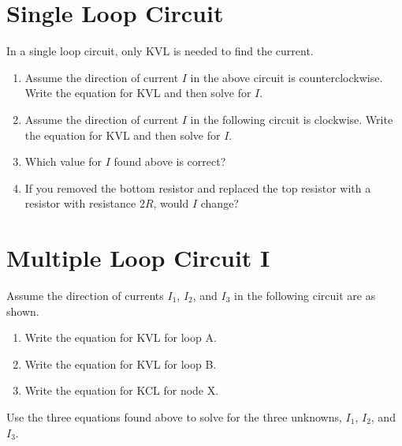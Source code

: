 \documentclass{article}
\begin{document}
\newpage

\section{Single Loop Circuit}

In a single loop circuit, only KVL is needed to find the current.



\begin{enumerate}

  \item Assume the direction of current $I$ in the above circuit is counterclockwise. Write the equation for KVL and then solve for $I$.

  \item Assume the direction of current $I$ in the following circuit is clockwise. Write the equation for KVL and then solve for $I$.

  \item Which value for $I$ found above is correct?

  \item If you removed the bottom resistor and replaced the top resistor with a resistor with resistance $2R$, would $I$ change?

\end{enumerate}

\section{Multiple Loop Circuit I}

Assume the direction of currents $I_1$, $I_2$, and $I_3$ in the following circuit are as shown.



\begin{enumerate}

  \item Write the equation for KVL for loop A.

  \item Write the equation for KVL for loop B.

  \item Write the equation for KCL for node X.

\end{enumerate}

Use the three equations found above to solve for the three unknowns, $I_1$, $I_2$, and $I_3$.
\end{document}
